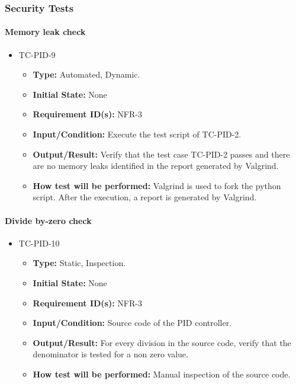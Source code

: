 \documentclass[12pt, titlepage]{article}
\begin{document}
\subsubsection{Security Tests}

\paragraph{Memory leak check}
\begin{itemize}
\item{TC-PID-9\\}
\begin{itemize}
\item{\textbf{Type:}} Automated, Dynamic.
					
\item{\textbf{Initial State:}} None

\item{\textbf{Requirement ID(s):}} NFR-3
					
\item{\textbf{Input/Condition:}}  Execute the test script of TC-PID-2.
					
\item{\textbf{Output/Result:}} Verify that the test case TC-PID-2 passes and there
are no memory leaks identified in the  report generated by Valgrind.

\item{\textbf{How test will be performed:}} Valgrind \cite{Valgrind} is used to fork
the python script. After the execution, a report is generated by Valgrind. 
\end{itemize}
\end{itemize}

\paragraph{Divide by-zero check}
\begin{itemize}
\item{TC-PID-10\\}
\begin{itemize}
\item{\textbf{Type:}} Static, Inspection.
					
\item{\textbf{Initial State:}} None

\item{\textbf{Requirement ID(s):}} NFR-3
					
\item{\textbf{Input/Condition:}}  Source code of the PID controller.
					
\item{\textbf{Output/Result:}} For every division in the source code, verify that
the denominator is tested for a non zero value. 

\item{\textbf{How test will be performed:}}  Manual inspection of the source code.
\end{itemize}
\end{itemize}
\end{document}
